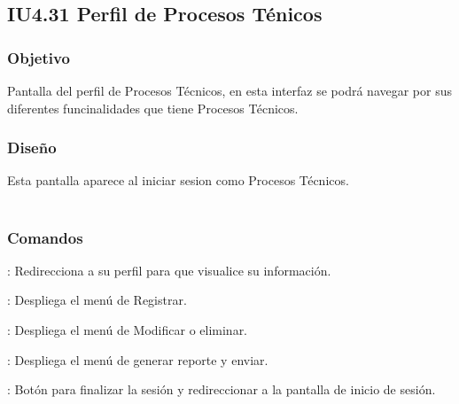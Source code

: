 \newpage
\subsection{IU4.31 Perfil de Procesos Ténicos}

\subsubsection{Objetivo}
	Pantalla del perfil de Procesos Técnicos, en esta interfaz se podrá navegar por sus diferentes funcinalidades que tiene Procesos Técnicos.  

\subsubsection{Diseño}
	Esta pantalla aparece al iniciar sesion como Procesos Técnicos.  \\\\



\subsubsection{Comandos}
	\begin{Citemize}
		\item {}: Redirecciona a su perfil para que visualice su información. 
		\item {}: Despliega el menú de Registrar.
		\item {}: Despliega el menú de Modificar o eliminar.
		\item {}: Despliega el menú de generar reporte y enviar.
		\item {}: Botón para finalizar la sesión y redireccionar a la pantalla de inicio de sesión.
	\end{Citemize}